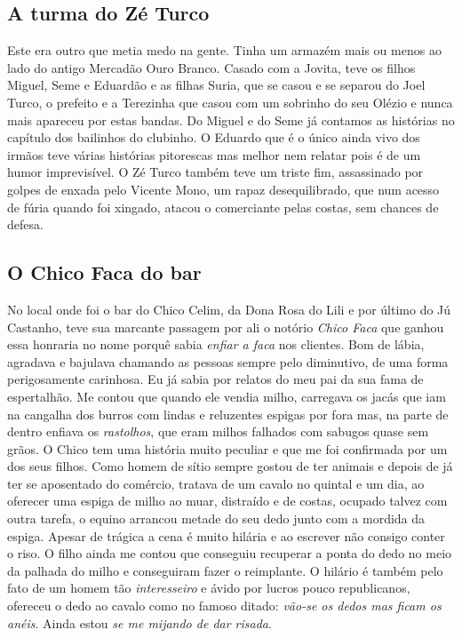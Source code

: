 \documentclass[12pt,brazil,]{book}
\begin{document}
\subsection{A turma do Zé Turco}\label{a-turma-do-zuxe9-turco}

Este era outro que metia medo na gente. Tinha um armazém mais ou menos
ao lado do antigo Mercadão Ouro Branco. Casado com a Jovita, teve os
filhos Miguel, Seme e Eduardão e as filhas Suria, que se casou e se
separou do Joel Turco, o prefeito e a Terezinha que casou com um
sobrinho do seu Olézio e nunca mais apareceu por estas bandas. Do Miguel
e do Seme já contamos as histórias no capítulo dos bailinhos do
clubinho. O Eduardo que é o único ainda vivo dos irmãos teve várias
histórias pitorescas mas melhor nem relatar pois é de um humor
imprevisível. O Zé Turco também teve um triste fim, assassinado por
golpes de enxada pelo Vicente Mono, um rapaz desequilibrado, que num
acesso de fúria quando foi xingado, atacou o comerciante pelas costas,
sem chances de defesa.

\subsection{O Chico Faca do bar}\label{o-chico-faca-do-bar}

No local onde foi o bar do Chico Celim, da Dona Rosa do Lili e por
último do Jú Castanho, teve sua marcante passagem por ali o notório
\emph{Chico Faca} que ganhou essa honraria no nome porquê sabia
\emph{enfiar a faca} nos clientes. Bom de lábia, agradava e bajulava
chamando as pessoas sempre pelo diminutivo, de uma forma perigosamente
carinhosa. Eu já sabia por relatos do meu pai da sua fama de
espertalhão. Me contou que quando ele vendia milho, carregava os jacás
que iam na cangalha dos burros com lindas e reluzentes espigas por fora
mas, na parte de dentro enfiava os \emph{rastolhos}, que eram milhos
falhados com sabugos quase sem grãos. O Chico tem uma história muito
peculiar e que me foi confirmada por um dos seus filhos. Como homem de
sítio sempre gostou de ter animais e depois de já ter se aposentado do
comércio, tratava de um cavalo no quintal e um dia, ao oferecer uma
espiga de milho ao muar, distraído e de costas, ocupado talvez com outra
tarefa, o equino arrancou metade do seu dedo junto com a mordida da
espiga. Apesar de trágica a cena é muito hilária e ao escrever não
consigo conter o riso. O filho ainda me contou que conseguiu recuperar a
ponta do dedo no meio da palhada do milho e conseguiram fazer o
reimplante. O hilário é também pelo fato de um homem tão
\emph{interesseiro} e ávido por lucros pouco republicanos, ofereceu o
dedo ao cavalo como no famoso ditado: \emph{vão-se os dedos mas ficam os
anéis}. Ainda estou \emph{se me mijando de dar risada}.
\end{document}
